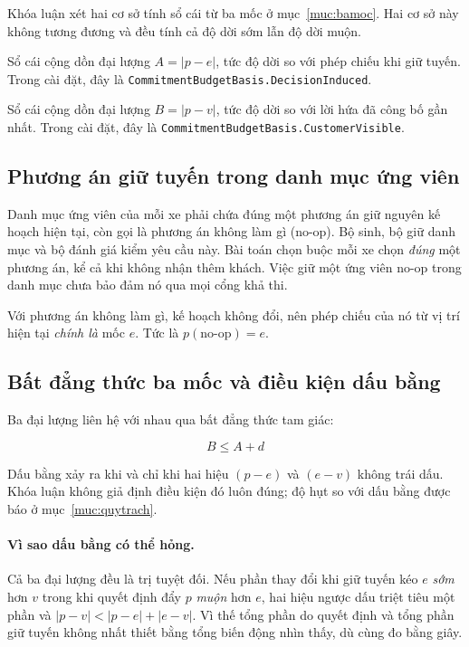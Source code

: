 Khóa luận xét hai cơ sở tính sổ cái từ ba mốc ở mục~\ref{muc:bamoc}. Hai cơ sở này không
tương đương và đều tính cả độ dời sớm lẫn độ dời muộn.

\begin{dinhnghia}[Cơ sở hành vi]
Sổ cái cộng dồn đại lượng $A = |p-e|$, tức độ dời so với phép chiếu khi giữ tuyến.
Trong cài đặt, đây là \texttt{CommitmentBudgetBasis.DecisionInduced}. 
\end{dinhnghia}

\begin{dinhnghia}
Sổ cái cộng dồn đại lượng $B = |p-v|$, tức độ dời so với lời hứa đã công bố gần nhất. Trong cài
đặt, đây là \texttt{CommitmentBudgetBasis.CustomerVisible}. 
\end{dinhnghia}

\subsection{Phương án giữ tuyến trong danh mục ứng viên}

Danh mục ứng viên của mỗi xe phải chứa đúng một phương án giữ nguyên kế hoạch hiện tại,
còn gọi là phương án không làm gì (no-op). Bộ sinh, bộ giữ danh mục và bộ đánh giá kiểm yêu
cầu này. Bài toán chọn buộc mỗi xe chọn \emph{đúng} một phương án, kể cả khi không nhận thêm
khách. Việc giữ một ứng viên no-op trong danh mục chưa bảo đảm nó qua mọi cổng khả thi.

Với phương án không làm gì, kế hoạch không đổi, nên phép chiếu của nó từ vị trí hiện tại
\emph{chính là} mốc $e$. Tức là $p(\text{no-op}) = e$.

\subsection{Bất đẳng thức ba mốc và điều kiện dấu bằng}
\label{muc:phanra}

Ba đại lượng liên hệ với nhau qua bất đẳng thức tam giác:

\begin{equation}
\boxed{\,B \le A + d\,}
\label{eq:phanra}
\end{equation}

Dấu bằng xảy ra khi và chỉ khi hai hiệu $(p-e)$ và $(e-v)$ không trái dấu. Khóa luận không
giả định điều kiện đó luôn đúng; độ hụt so với dấu bằng được báo ở mục~\ref{muc:quytrach}.

\paragraph{Vì sao dấu bằng có thể hỏng.} Cả ba đại lượng đều là trị tuyệt đối. Nếu phần thay đổi
khi giữ tuyến kéo $e$ \emph{sớm} hơn $v$ trong khi quyết định đẩy $p$ \emph{muộn} hơn $e$, hai hiệu
ngược dấu triệt tiêu một phần và $|p-v| < |p-e| + |e-v|$. Vì thế tổng phần do quyết định và
tổng phần giữ tuyến không nhất thiết bằng tổng biến động nhìn thấy, dù cùng đo bằng giây.

